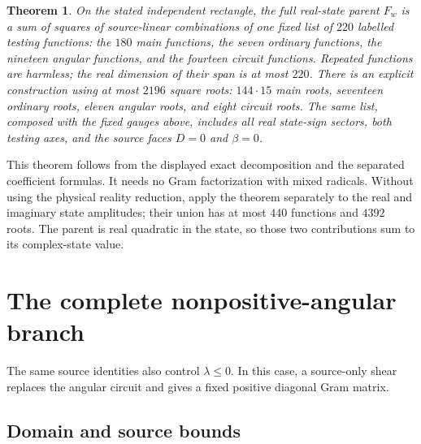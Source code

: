 \documentclass[11pt]{article}
\newtheorem{theorem}{Theorem}
\begin{document}
\begin{theorem}
On the stated independent rectangle, the full real-state parent
$F_w$ is a sum of squares of source-linear combinations of one
fixed list of $220$ labelled testing functions: the $180$ main
functions, the seven ordinary functions, the nineteen angular
functions, and the fourteen circuit functions. Repeated functions
are harmless; the real dimension of their span is at most $220$.
There is an explicit construction using at most $2196$ square
roots: $144\cdot15$ main roots, seventeen ordinary roots, eleven
angular roots, and eight circuit roots. The same list, composed
with the fixed gauges above, includes all real state-sign sectors,
both testing axes, and the source faces $D=0$ and $\beta=0$.
\end{theorem}

This theorem follows from the displayed exact decomposition and
the separated coefficient formulas. It needs no Gram factorization
with mixed radicals. Without using the physical reality reduction,
apply the theorem separately to the real and imaginary state
amplitudes; their union has at most $440$ functions and $4392$
roots. The parent is real quadratic in the state, so those two
contributions sum to its complex-state value.


\section{The complete nonpositive-angular branch}\label{sec:fixed-c1-nonpositive}

The same source identities also control $\lambda\le0$. In this case,
a source-only shear replaces the angular circuit and gives a fixed
positive diagonal Gram matrix.

\subsection{Domain and source bounds}
\end{document}
